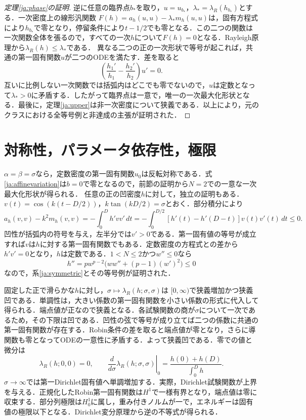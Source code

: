 \documentclass[12pt]{amsart}
\theoremstyle{definition}
\theoremstyle{remark}
\numberwithin{equation}{section}
\begin{document}
\begin{proof}[定理\ref{ja:phase}の証明]
逆に任意の臨界点$b_*$を取り，$u=u_{b_*}$，$\lambda_* =\lambda_R(h_{b_*})$とする．一次密度上の線形汎関数
$F(h)=a_h(u,u)-\lambda_*m_h(u,u)$は，固有方程式により$h_{b_*}$で零となり，停留条件により$t-1/2$でも零となる．この二つの関数は一次関数全体を張るので，すべての一次$h$について$F(h)=0$となる．Rayleigh原理から$\lambda_R(h)\le\lambda_*$である．
異なる二つの正の一次形状で等号が起これば，共通の第一固有関数$u$が二つのODEを満たす．差を取ると
\[
 \left(\frac{h_1'}{h_1}-\frac{h_2'}{h_2}\right)u'=0.
\]
互いに比例しない一次関数では括弧内はどこでも零でないので，$u$は定数となって$\lambda_*>0$に矛盾する．したがって臨界点は一意で，唯一の一次最大化形状となる．最後に，定理\ref{ja:upper}は非一次密度について狭義である．以上により，元のクラスにおける全等号例と非達成の主張が証明された．
\end{proof}

\section{対称性，パラメータ依存性，極限}
$\alpha=\beta=\sigma$なら，定数密度の第一固有関数$u_0$は反転対称である．式\eqref{ja:affinevariation}は$b=0$で零となるので，前節の証明から$N=2$での一意な一次最大化形状が得られる．
任意の正の凹密度$h$に対して，独立の証明もある．
$v(t)=\cos(k(t-D/2))$，$k\tan(kD/2)=\sigma$とおく．部分積分により
\[
 a_h(v,v)-k^2m_h(v,v)=-\int_0^D h'vv'\,dt
 =-\int_0^{D/2}[h'(t)-h'(D-t)]v(t)v'(t)\,dt\le0.
\]
凹性が括弧内の符号を与え，左半分では$v'>0$である．第一固有値の等号が成立すれば$v$は$h$に対する第一固有関数でもある．定数密度の方程式との差から$h'v'=0$となり，$h$は定数である．$1<N\le2$かつ$w''\le0$なら
\[
 h''=p w^{p-2}\bigl(ww''+(p-1)(w')^2\bigr)\le0
\]
なので，系\ref{ja:symmetric}とその等号例が証明された．

固定した正で滑らかな$h$に対し，$\sigma\mapsto\lambda_R(h;\sigma,\sigma)$は
$[0,\infty)$で狭義増加かつ狭義凹である．単調性は，大きい係数の第一固有関数を小さい係数の形式に代入して得られる．端点値が正なので狭義となる．各試験関数の商が$\sigma$について一次であるため，その下限は凹である．凹性の弦で等号が成り立てば二つの係数に共通の第一固有関数が存在する．Robin条件の差を取ると端点値が零となり，さらに導関数も零となってODEの一意性に矛盾する．よって狭義凹である．零での値と微分は
\[
 \lambda_R(h;0,0)=0,\qquad
 \left.\frac{d}{d\sigma}\lambda_R(h;\sigma,\sigma)\right|_{0}
 =\frac{h(0)+h(D)}{\int_0^Dh}.
\]
$\sigma\to\infty$では第一Dirichlet固有値へ単調増加する．実際，Dirichlet試験関数が上界を与える．正規化したRobin第一固有関数は$H^1$で一様有界となり，端点値は零に収束する．部分列極限は$H^1_0$に属し，重み付きノルムが一で，エネルギーは固有値の極限以下となる．Dirichlet変分原理から逆の不等式が得られる．
\end{document}
